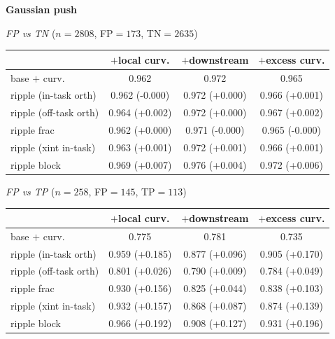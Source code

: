 \begin{table}[t]
\medskip
\textbf{Gaussian push}


\smallskip
\textit{FP vs TN} ($n=2808$, FP$=173$, TN$=2635$)

\begin{tabular}{l c c c}
\toprule
 & $+$local curv. & $+$downstream & $+$excess curv. \\
\midrule
base $+$ curv. & 0.962 & 0.972 & 0.965 \\
\midrule
ripple (in-task orth) & 0.962 (-0.000) & 0.972 (+0.000) & 0.966 (+0.001) \\
ripple (off-task orth) & 0.964 (+0.002) & 0.972 (+0.000) & 0.967 (+0.002) \\
ripple frac & 0.962 (+0.000) & 0.971 (-0.000) & 0.965 (-0.000) \\
ripple (xint in-task) & 0.963 (+0.001) & 0.972 (+0.001) & 0.966 (+0.001) \\
ripple block & 0.969 (+0.007) & 0.976 (+0.004) & 0.972 (+0.006) \\
\bottomrule
\end{tabular}

\smallskip
\textit{FP vs TP} ($n=258$, FP$=145$, TP$=113$)

\begin{tabular}{l c c c}
\toprule
 & $+$local curv. & $+$downstream & $+$excess curv. \\
\midrule
base $+$ curv. & 0.775 & 0.781 & 0.735 \\
\midrule
ripple (in-task orth) & 0.959 (+0.185) & 0.877 (+0.096) & 0.905 (+0.170) \\
ripple (off-task orth) & 0.801 (+0.026) & 0.790 (+0.009) & 0.784 (+0.049) \\
ripple frac & 0.930 (+0.156) & 0.825 (+0.044) & 0.838 (+0.103) \\
ripple (xint in-task) & 0.932 (+0.157) & 0.868 (+0.087) & 0.874 (+0.139) \\
ripple block & 0.966 (+0.192) & 0.908 (+0.127) & 0.931 (+0.196) \\
\bottomrule
\end{tabular}

\end{table}
